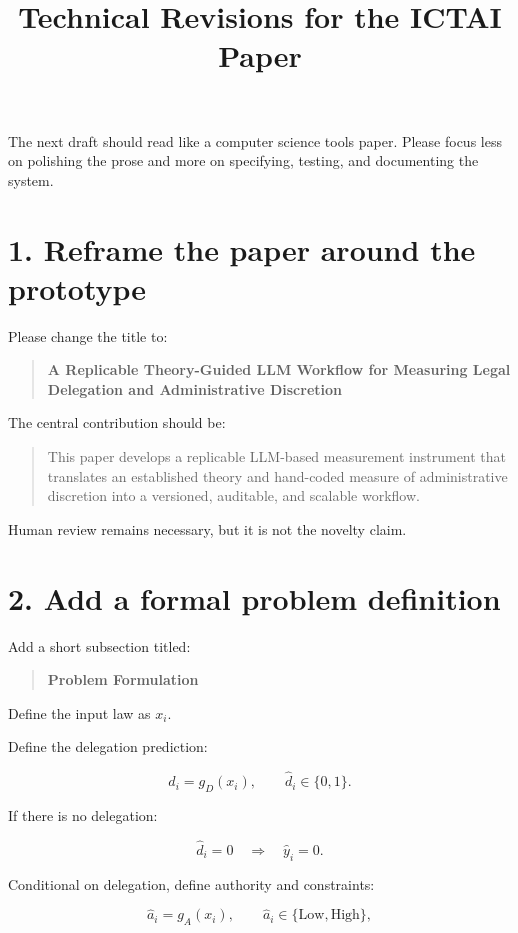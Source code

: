 \documentclass[11pt]{article}
\title{\textbf{Technical Revisions for the ICTAI Paper}}
\author{}
\date{}
\begin{document}
\maketitle



The next draft should read like a computer science tools paper. Please focus less on polishing the prose and more on specifying, testing, and documenting the system.

\section*{1. Reframe the paper around the prototype}

Please change the title to:

\begin{quote}
\textbf{A Replicable Theory-Guided LLM Workflow for Measuring Legal Delegation and Administrative Discretion}
\end{quote}

The central contribution should be:

\begin{quote}
This paper develops a replicable LLM-based measurement instrument that translates an established theory and hand-coded measure of administrative discretion into a versioned, auditable, and scalable workflow.
\end{quote}

Human review remains necessary, but it is not the novelty claim.

\section*{2. Add a formal problem definition}

Add a short subsection titled:

\begin{quote}
\textbf{Problem Formulation}
\end{quote}

Define the input law as \(x_i\).

Define the delegation prediction:

\[
\hat d_i = g_D(x_i),
\qquad
\hat d_i \in \{0,1\}.
\]

If there is no delegation:

\[
\hat d_i = 0
\quad \Rightarrow \quad
\hat y_i = 0.
\]

Conditional on delegation, define authority and constraints:

\[
\hat a_i = g_A(x_i),
\qquad
\hat a_i \in \{\text{Low},\text{High}\},
\]
\end{document}
